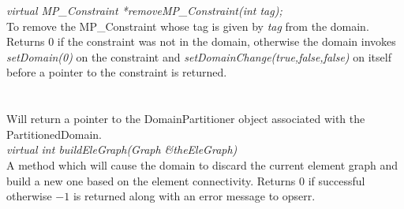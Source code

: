 {\em virtual MP\_Constraint *removeMP\_Constraint(int tag);} \\
To remove the MP\_Constraint whose tag is given by {\em tag} from the
domain. Returns $0$ if the constraint was not in the domain, otherwise
the domain invokes {\em setDomain(0)} on the constraint and {\em
setDomainChange(true,false,false)} on itself before a pointer to the
constraint is returned.\\  




  \\
 \\
Will return a pointer to the DomainPartitioner object associated with the
PartitionedDomain. \\

{\em virtual int buildEleGraph(Graph \&theEleGraph)} \\
A method which will cause the domain to discard the current element
graph and build a new one based on the element connectivity. Returns
$0$ if successful otherwise $-1$ is returned along with an error
message to opserr. \\
